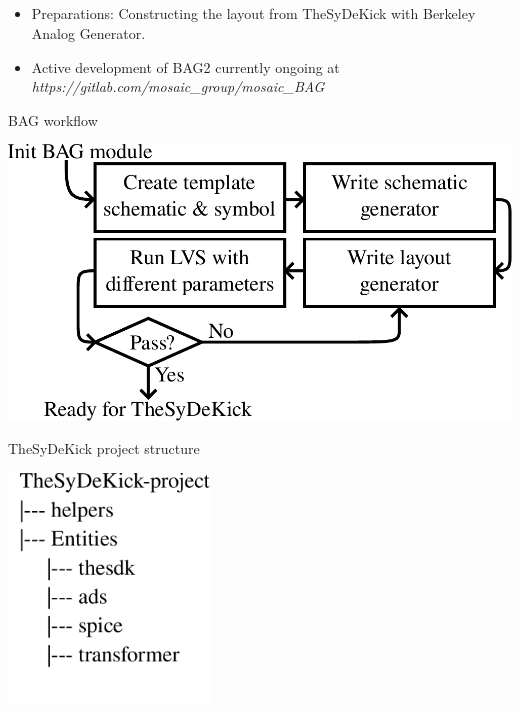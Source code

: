 \documentclass{sdkslides}
\begin{document}
\subsection*{\sectionname}
\begin{frame}[c]
    \frametitle{\sectionname}
    \begin{itemize}
        \item Preparations: Constructing the layout from TheSyDeKick with
            Berkeley Analog Generator.
        \item Active development of BAG2 currently ongoing at
            \emph{https://gitlab.com/mosaic\_group/mosaic\_BAG}
    \end{itemize}
    \begin{minipage}[t]{0.48\textwidth}
        \vskip 0pt
        \begin{block}{BAG workflow}
            \begin{center}
                \includegraphics[width=\textwidth]{./Pics/bag_workflow}
            \end{center}
        \end{block}
    \end{minipage}\hfill
    \begin{minipage}[t]{0.48\textwidth}
        \vskip 0pt
        \begin{block}{TheSyDeKick project structure}
            \begin{center}
                \includegraphics[width=0.4\textwidth]{./Pics/sdk_dirtree_v2}

\end{center}
\end{block}
\end{minipage}
\end{frame}
\end{document}
